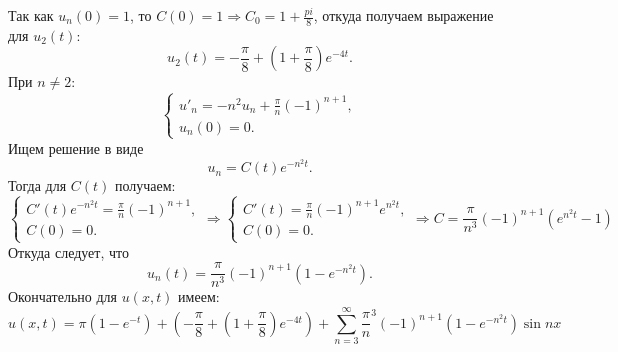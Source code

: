 \documentclass[11pt]{article}
\begin{document}
Так как $u_n(0) = 1$, то $C(0) = 1 \Rightarrow C_0 = 1 + \frac{pi}8$, откуда получаем выражение
для $u_2(t)$:
\begin{equation}
u_2(t) = -\frac{\pi}8 + \left(1 + \frac{\pi}8\right)e^{-4t}.
\end{equation}
При $n \neq 2$:
\begin{equation}
\begin{cases}
u'_n = -n^2u_n + \frac{\pi}n(-1)^{n + 1}, \\
u_n(0) = 0.
\end{cases}
\end{equation}
Ищем решение в виде
\begin{equation*}
u_n = C(t)e^{-n^2t}.
\end{equation*}
Тогда для $C(t)$ получаем:
\begin{equation*}
\begin{cases}
C'(t)e^{-n^2t} = \frac{\pi}n(-1)^{n + 1}, \\
C(0) = 0.
\end{cases}
\Rightarrow
\begin{cases}
C'(t) = \frac{\pi}n(-1)^{n + 1}e^{n^2t}, \\
C(0) = 0.
\end{cases}
\Rightarrow
C = \frac{\pi}{n^3}(-1)^{n + 1}(e^{n^2t} - 1)
\end{equation*}
Откуда следует, что
\begin{equation}
u_n(t) = \frac{\pi}{n^3}(-1)^{n + 1}(1 - e^{-n^2t}).
\end{equation}
Окончательно для $u(x, t)$ имеем:
\begin{equation}
u(x, t) = \pi(1 - e^{-t}) + \left(-\frac{\pi}8 + \left(1 + \frac{\pi}8\right)e^{-4t}\right) +
\sum_{n = 3}^{\infty}\frac{\pi}n^3(-1)^{n + 1}(1 - e^{-n^2t})\sin nx
\end{equation}
\end{document}
